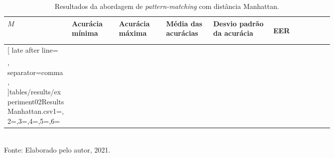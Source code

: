 \begin{table}[H]
	\newcommand{\mc}[3]{\multicolumn{#1}{#2}{#3}}
	\begin{center}
		\caption{Resultados da abordagem de \textit{pattern-matching} com distância Manhattan.}
		\begin{tabular}{|p{0.15\linewidth}|p{0.11\linewidth}|p{0.11\linewidth}|p{0.11\linewidth}|p{0.14\linewidth}|p{0.14\linewidth}|}\hline
			\rowcolor{tcA}
			\centering\textbf{$M$} & \centering\textbf{Acurácia mínima} & \centering\textbf{Acurácia máxima} & \centering\textbf{Média das acurácias} & \centering\textbf{Desvio padrão da acurácia} & \begin{center}\textbf{EER}\end{center}\\\hline
			
			\rowcolor{tcB}
			\csvreader[
			late after line=\\\hline\rowcolor{tcB},%
			separator=comma,
			]{tables/results/experiment02ResultsManhattan.csv}{1=\eme,2=\minAccu,3=\maxAccu,4=\meanAccu,5=\stdDev,6=\eer}{\centering\eme\% & \centering\StrSubstitute[0]{\minAccu}{.}{,} & \centering\StrSubstitute[0]{\maxAccu}{.}{,} & \centering\StrSubstitute[0]{\meanAccu}{.}{,} & \centering\StrSubstitute[0]{\stdDev}{.}{,} & \StrSubstitute[0]{\eer}{.}{,}}
		\end{tabular}
		\label{tab:experiment02ResultsManhattan}
		\\Fonte: Elaborado pelo autor, 2021.
	\end{center}
\end{table}